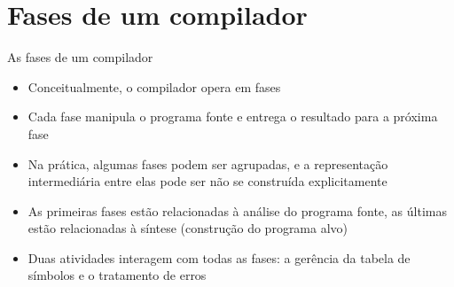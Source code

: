\section{Fases de um compilador}

\begin{frame}[fragile]{As fases de um compilador}

    \begin{itemize}
        \item Conceitualmente, o compilador opera em fases

        \item Cada fase manipula o programa fonte e entrega o resultado para a próxima fase

        \item Na prática, algumas fases podem ser agrupadas, e a representação intermediária entre elas pode ser não se construída explicitamente

        \item As primeiras fases estão relacionadas à análise do programa fonte, as últimas estão relacionadas à síntese (construção do programa alvo)

        \item Duas atividades interagem com todas as fases: a gerência da tabela de símbolos e o tratamento de erros
    \end{itemize}

\end{frame}

